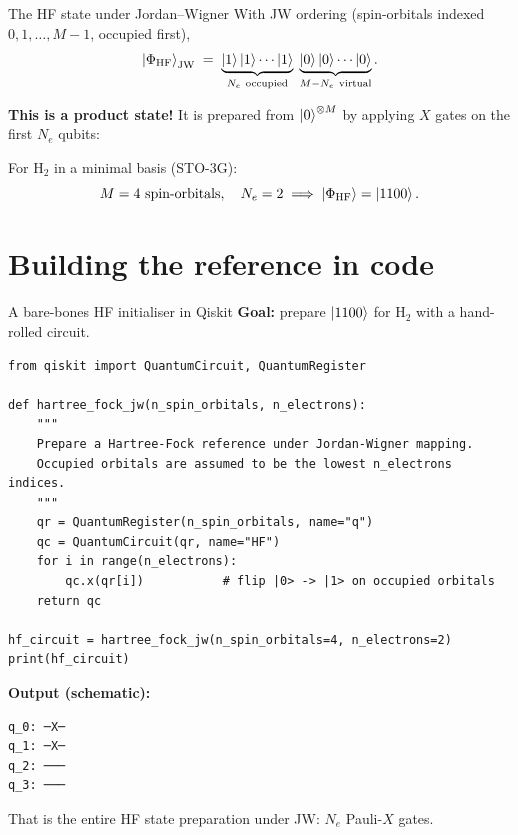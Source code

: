 \documentclass[10pt,aspectratio=169]{beamer}
\begin{document}
\begin{frame}{The HF state under Jordan--Wigner}
With JW ordering (spin-orbitals indexed $0,1,\ldots,M-1$, occupied first),
\[
\ket{\Phi_{\text{HF}}}_{\text{JW}}
\;=\;
\underbrace{\ket{1}\ket{1}\cdots\ket{1}}_{N_e\ \text{occupied}}
\;
\underbrace{\ket{0}\ket{0}\cdots\ket{0}}_{M-N_e\ \text{virtual}}.
\]

\textbf{This is a product state!} It is prepared from $\ket{0}^{\otimes M}$ by applying $X$ gates on the first $N_e$ qubits:

\begin{center}
\end{center}

\smallskip
For $\mathrm{H}_2$ in a minimal basis (STO-3G):
\[
M = 4\ \text{spin-orbitals},\quad N_e = 2 \;\Longrightarrow\; \ket{\Phi_{\text{HF}}} = \ket{1100}.
\]
\end{frame}

\section{Building the reference in code}

\begin{frame}[fragile]{A bare-bones HF initialiser in Qiskit}
\textbf{Goal:} prepare $\ket{1100}$ for H$_2$ with a hand-rolled circuit.
\begin{lstlisting}
from qiskit import QuantumCircuit, QuantumRegister

def hartree_fock_jw(n_spin_orbitals, n_electrons):
    """
    Prepare a Hartree-Fock reference under Jordan-Wigner mapping.
    Occupied orbitals are assumed to be the lowest n_electrons indices.
    """
    qr = QuantumRegister(n_spin_orbitals, name="q")
    qc = QuantumCircuit(qr, name="HF")
    for i in range(n_electrons):
        qc.x(qr[i])           # flip |0> -> |1> on occupied orbitals
    return qc

hf_circuit = hartree_fock_jw(n_spin_orbitals=4, n_electrons=2)
print(hf_circuit)
\end{lstlisting}

\smallskip
\textbf{Output (schematic):}
\begin{verbatim}
q_0: ─X─
q_1: ─X─
q_2: ───
q_3: ───
\end{verbatim}
That is the entire HF state preparation under JW: $N_e$ Pauli-$X$ gates.
\end{frame}
\end{document}
